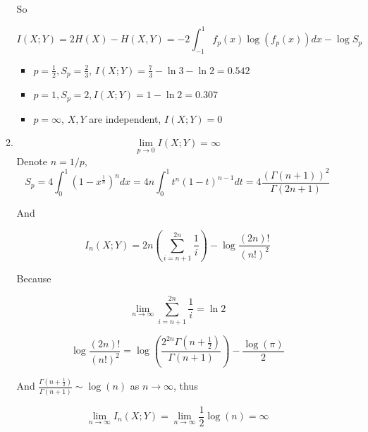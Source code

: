 \documentclass[a4paper]{article}
\begin{document}
\begin{enumerate}
\begin{enumerate}
    So

    \begin{equation}
      I(X;Y) = 2H(X)-H(X,Y) = -2 \int_{-1}^1 f_p(x)\log(f_p(x)) dx -\log  S_p
    \end{equation}

    \begin{itemize}
      \item $p=\frac 1 2,S_p = \frac 2 3$, $I(X;Y) =\frac 7 3 -\ln3-\ln2 = 0.542$
      \item $p = 1,S_p = 2,I(X;Y) = 1 -\ln 2 = 0.307$
      \item $p = \infty$, $X,Y$ are independent, $I(X;Y) = 0$
    \end{itemize}

    \item \begin{equation}
      \lim_{p\to 0} I(X;Y) = \infty
    \end{equation}
    Denote $n = 1/p$,
    \begin{equation}
      S_p = 4\int_{0}^1 (1-x^{\frac 1 n})^n dx = 4n\int_{0}^1 t^n (1-t)^{n-1}dt  = 4 \frac {(\Gamma(n+1))^2}{\Gamma(2n+1)}
    \end{equation}

    And 

    \begin{equation}
      I_n(X;Y) = 2n(\sum_{i=n+1}^{2n} \frac 1 i)  - \log \frac {(2n)!}{(n!)^2}
    \end{equation}

    Because 

    \begin{equation}
      \lim_{n\to\infty} \sum_{i=n+1}^{2n} \frac 1 i  = \ln 2
    \end{equation}


    \begin{equation}
      \log \frac {(2n)!}{(n!)^2} = \log \left(\frac{2^{2 n} \Gamma\left(n+\frac{1}{2}\right)}{\Gamma(n+1)}\right)-\frac{\log (\pi)}{2}
    \end{equation}

    And $\frac{ \Gamma\left(n+\frac{1}{2}\right)}{\Gamma(n+1)} \sim \log(n)$ as $n\to\infty$, thus

    \begin{equation}
      \lim_{n\to \infty} I_n(X;Y) =  \lim_{n\to \infty} \frac 1 2 \log(n) =  \infty
    \end{equation}

    \end{enumerate}


\end{enumerate}
\end{document}
